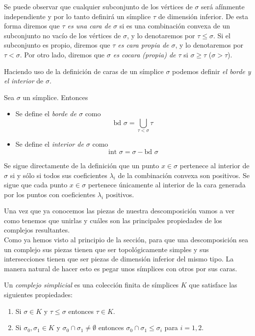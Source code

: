 Se puede observar que cualquier subconjunto de los vértices de $\sigma$ será afínmente independiente y por lo tanto definirá un símplice $\tau$ de dimensión inferior. De esta forma diremos que \emph{$\tau$ es una cara de $\sigma$} si es una combinación convexa de un subconjunto no vacío de los vértices de $\sigma$, y lo denotaremos por $\tau \leq \sigma$. Si el subconjunto es propio, diremos que \emph{$\tau$ es cara propia de $\sigma$}, y lo denotaremos por $\tau < \sigma$. Por otro lado, diremos que \emph{$\sigma$ es cocara (propia) de $\tau$}  si $\sigma \geq \tau$ ($\sigma > \tau$).

Haciendo uso de la definición de caras de un símplice $\sigma$ podemos definir \emph{el borde y el interior} de $\sigma$.

\begin{definition}
Sea $\sigma$ un símplice. Entonces
\begin{itemize}
	\item Se define el \emph{borde de $\sigma$} como \[\text{bd } \sigma = \bigcup_{\tau<\sigma}\tau\]
	\item Se define el \emph{interior de $\sigma$} como \[\text{int }\sigma= \sigma - \text{bd }\sigma\]
\end{itemize}
\end{definition}

\begin{remark}
Se sigue directamente de la definición que un punto $x \in \sigma$ pertenece al interior de $\sigma$ si y sólo si todos sus coeficientes $\lambda_i$ de la combinación convexa son positivos. Se sigue que cada punto $x \in \sigma$ pertenece únicamente al interior de la cara generada por los puntos con coeficientes $\lambda_i$ positivos.
\end{remark}

Una vez que ya conocemos las piezas de nuestra descomposición vamos a ver como tenemos que unirlas y cuáles son las principales propiedades de los complejos resultantes.\\
Como ya hemos visto al principio de la sección, para que una descomposición sea un complejo sus piezas tienen que ser topológicamente simples y sus intersecciones tienen que ser piezas de dimensión inferior del mismo tipo. La manera natural de hacer esto es pegar unos símplices con otros por sus caras.

\begin{definition}
Un \emph{complejo simplicial} es una colección finita de símplices $K$ que satisface las siguientes propiedades:
\begin{enumerate}
	\item Si $\sigma \in K$ y $\tau \leq \sigma$ entonces $\tau \in K$.
	\item Si $\sigma_0,\sigma_1 \in K$ y $\sigma_0 \cap \sigma_1 \neq \emptyset$ entonces $\sigma_0 \cap \sigma_1 \leq \sigma_i$ para $i = 1,2$.
\end{enumerate}
\end{definition}

